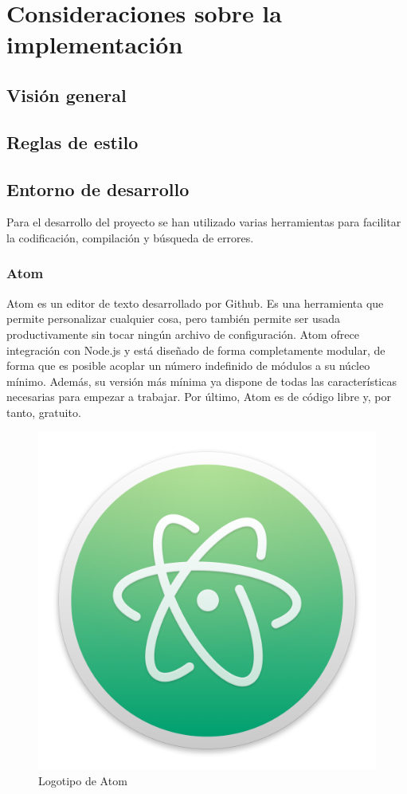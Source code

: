 \chapter{Consideraciones sobre la implementación}

\section{Visión general}

\section{Reglas de estilo}

\section{Entorno de desarrollo}

	Para el desarrollo del proyecto se han utilizado varias herramientas para facilitar la codificación, compilación y búsqueda de errores.

	\subsection{Atom}

		Atom es un editor de texto desarrollado por Github. Es una herramienta que permite personalizar cualquier cosa, pero también permite ser usada productivamente sin tocar ningún archivo de configuración. Atom ofrece integración con Node.js y está diseñado de forma completamente modular, de forma que es posible acoplar un número indefinido de módulos a su núcleo mínimo. Además, su versión más mínima ya dispone de todas las características necesarias para empezar a trabajar. Por último, Atom es de código libre y, por tanto, gratuito.

		\begin{figure}[!htp]
			 \centering
			 \includegraphics[scale=.15]{fig/atom}
			 \caption{Logotipo de Atom}
			 \label{fig:atom}
		\end{figure}

